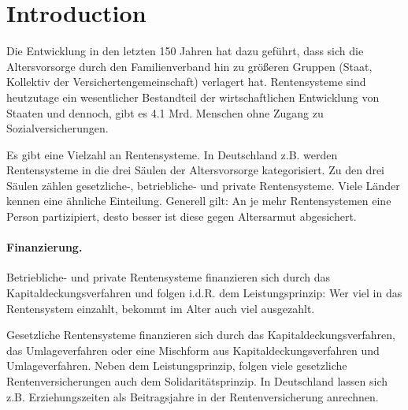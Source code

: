 \section{Introduction}


Die Entwicklung in den letzten 150 Jahren hat dazu geführt, dass sich die Altersvorsorge durch den Familienverband hin zu größeren Gruppen (Staat, Kollektiv der Versichertengemeinschaft) verlagert hat. Rentensysteme sind heutzutage ein wesentlicher Bestandteil der wirtschaftlichen Entwicklung von Staaten und dennoch, gibt es 4.1 Mrd. Menschen ohne Zugang zu Sozialversicherungen.\cite{ilo}

Es gibt eine Vielzahl an Rentensysteme. In Deutschland z.B. werden Rentensysteme in die drei Säulen der Altersvorsorge kategorisiert. Zu den drei Säulen zählen gesetzliche-, betriebliche- und private Rentensysteme. Viele Länder kennen eine ähnliche Einteilung. Generell gilt: An je mehr Rentensystemen eine Person partizipiert, desto besser ist diese gegen Altersarmut abgesichert.

\paragraph{Finanzierung.} Betriebliche- und private Rentensysteme finanzieren sich durch das Kapitaldeckungsverfahren und folgen i.d.R. dem Leistungsprinzip: Wer viel in das Rentensystem einzahlt, bekommt im Alter auch viel ausgezahlt.

Gesetzliche Rentensysteme finanzieren sich durch das Kapitaldeckungsverfahren, das Umlageverfahren oder eine Mischform aus Kapitaldeckungsverfahren und Umlageverfahren. Neben dem Leistungsprinzip, folgen viele gesetzliche Rentenversicherungen auch dem Solidaritätsprinzip. In Deutschland lassen sich z.B. Erziehungszeiten als Beitragsjahre in der Rentenversicherung anrechnen.

